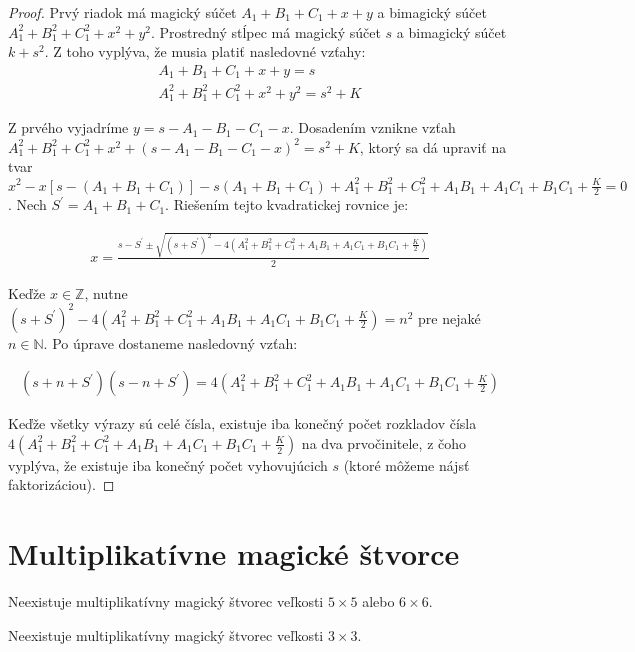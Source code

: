 \begin{proof} Prvý riadok má magický súčet $A_1 + B_1 + C_1 + x + y$ a bimagický súčet $A_1^2 + B_1^2 + C_1^2 + x^2 + y^2$. Prostredný stĺpec má magický súčet $s$ a bimagický súčet $k + s^2$. Z toho vyplýva, že musia platiť nasledovné vzťahy:
\begin{gather}
A_1 + B_1 + C_1 + x + y = s \\
A_1^2 + B_1^2 + C_1^2 + x^2 + y^2 = s^2 + K
\end{gather}

Z prvého vyjadríme $y = s - A_1 - B_1 - C_1 - x$. Dosadením vznikne vzťah $A_1^2 + B_1^2 + C_1^2 + x^2 + (s - A_1 - B_1 - C_1 - x)^2 = s^2 + K$, ktorý sa dá upraviť na tvar $x^2 - x[s - (A_1 + B_1 + C_1)] - s(A_1 + B_1 + C_1) + A_1^2 + B_1^2 + C_1^2 + A_1 B_1 + A_1 C_1 + B_1 C_1 + \frac{K}{2} = 0$. Nech $S^\prime = A_1 + B_1 + C_1$. Riešením tejto kvadratickej rovnice je:

\begin{gather}
x = \frac{s - S^\prime \pm \sqrt{(s + S^\prime)^2 - 4(A_1^2 + B_1^2 + C_1^2 + A_1 B_1 + A_1 C_1 + B_1 C_1 + \frac{K}{2})}}{2}
\end{gather}

Keďže $x \in \mathbb{Z}$, nutne $(s + S^\prime)^2 - 4(A_1^2 + B_1^2 + C_1^2 + A_1 B_1 + A_1 C_1 + B_1 C_1 + \frac{K}{2}) = n^2$ pre nejaké $n \in \mathbb{N}$. Po úprave dostaneme nasledovný vzťah:

\begin{gather}
(s + n + S^\prime)(s - n + S^\prime) = 4(A_1^2 + B_1^2 + C_1^2 + A_1 B_1 + A_1 C_1 + B_1 C_1 + \frac{K}{2})
\end{gather}

Keďže všetky výrazy sú celé čísla, existuje iba konečný počet rozkladov čísla $4(A_1^2 + B_1^2 + C_1^2 + A_1 B_1 + A_1 C_1 + B_1 C_1 + \frac{K}{2})$ na dva prvočinitele, z čoho vyplýva, že existuje iba konečný počet vyhovujúcich $s$ (ktoré môžeme nájsť faktorizáciou).
\end{proof} 

\section{Multiplikatívne magické štvorce}

\begin{hypothesis} Neexistuje multiplikatívny magický štvorec veľkosti $5 \times 5$ alebo $6 \times 6$.
\end{hypothesis} 

\begin{theorem} Neexistuje multiplikatívny magický štvorec veľkosti $3 \times 3$.
\end{theorem}

